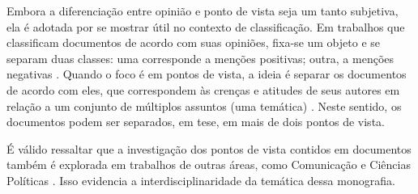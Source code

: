 Embora a diferenciação entre opinião e ponto de vista seja um tanto subjetiva, ela é adotada por se mostrar útil no contexto de classificação. Em trabalhos que classificam documentos de acordo com suas opiniões, fixa-se um objeto e se separam duas classes: uma corresponde a menções positivas; outra, a menções negativas \cite{omsa}. Quando o foco é em pontos de vista, a ideia é separar os documentos de acordo com eles, que correspondem às crenças e atitudes de seus autores em relação a um conjunto de múltiplos assuntos (uma temática) \cite{omsa}. Neste sentido, os documentos podem ser separados, em tese, em mais de dois pontos de vista.

É válido ressaltar que a investigação dos pontos de vista contidos em documentos também é explorada em trabalhos de outras áreas, como Comunicação e  Ciências Políticas \cite{gentzkow} \cite{milyo} \cite{fader}. Isso evidencia a interdisciplinaridade da temática dessa monografia. 

                              


 






